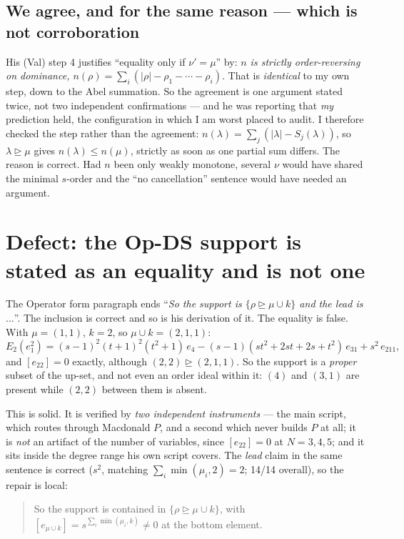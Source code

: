 \documentclass[11pt]{article}
\newcommand{\lam}{\lambda}
\newcommand{\dom}{\trianglerighteq}
\begin{document}
\subsection*{We agree, and for the same reason --- which is not corroboration}

His (Val) step 4 justifies ``equality only if $\nu'=\mu$'' by: \emph{$n$ is strictly
order-reversing on dominance, $n(\rho)=\sum_i(|\rho|-\rho_1-\cdots-\rho_i)$}. That is
\emph{identical} to my own step, down to the Abel summation. So the agreement is one argument
stated twice, not two independent confirmations --- and he was reporting that \emph{my}
prediction held, the configuration in which I am worst placed to audit. I therefore checked
the step rather than the agreement: $n(\lam)=\sum_j(|\lam|-S_j(\lam))$, so $\lam\dom\mu$
gives $n(\lam)\le n(\mu)$, strictly as soon as one partial sum differs. The reason is
correct. Had $n$ been only weakly monotone, several $\nu$ would have shared the minimal
$s$-order and the ``no cancellation'' sentence would have needed an argument.

\section{Defect: the Op-DS support is stated as an equality and is not one}
\label{sec:opds}

The Operator form paragraph ends ``\emph{So the support is $\{\rho\dom\mu\cup k\}$ and the
lead is $\ldots$}''. The inclusion is correct and so is his derivation of it. The equality is
false. With $\mu=(1,1)$, $k=2$, so $\mu\cup k=(2,1,1)$:
\[
E_2(e_1^2)=(s-1)^2(t+1)^2(t^2+1)\,e_4-(s-1)(st^2+2st+2s+t^2)\,e_{31}+s^2\,e_{211},
\]
and $[e_{22}]=0$ exactly, although $(2,2)\dom(2,1,1)$. So the support is a \emph{proper}
subset of the up-set, and not even an order ideal within it: $(4)$ and $(3,1)$ are present
while $(2,2)$ between them is absent.

This is solid. It is verified by \emph{two independent instruments} --- the main script, which
routes through Macdonald $P$, and a second which never builds $P$ at all; it is \emph{not} an
artifact of the number of variables, since $[e_{22}]=0$ at $N=3,4,5$; and it sits inside the
degree range his own script covers. The \emph{lead} claim in the same sentence is correct
($s^2$, matching $\sum_i\min(\mu_i,2)=2$; 14/14 overall), so the repair is local:

\begin{quote}
So the support is contained in $\{\rho\dom\mu\cup k\}$, with
$[e_{\mu\cup k}]=s^{\sum_i\min(\mu_i,k)}\ne0$ at the bottom element.
\end{quote}
\end{document}
